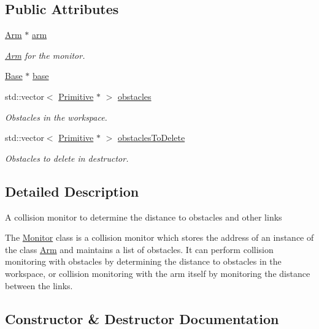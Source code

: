 \subsection*{Public Attributes}
\begin{DoxyCompactItemize}
\item 
\hyperlink{class_arm}{Arm} $\ast$ \hyperlink{class_monitor_a8b75571f6224f999a3dc05cf9a83fa68}{arm}
\begin{DoxyCompactList}\small\item\em \hyperlink{class_arm}{Arm} for the monitor. \end{DoxyCompactList}\item 
\hyperlink{class_base}{Base} $\ast$ \hyperlink{class_monitor_a62aac32130c77d66f9cec4a06d5e75a7}{base}
\item 
std\+::vector$<$ \hyperlink{class_primitive}{Primitive} $\ast$ $>$ \hyperlink{class_monitor_a05fd42482269ad65432d5400c8f0f9b5}{obstacles}
\begin{DoxyCompactList}\small\item\em Obstacles in the workspace. \end{DoxyCompactList}\item 
std\+::vector$<$ \hyperlink{class_primitive}{Primitive} $\ast$ $>$ \hyperlink{class_monitor_a2207169c2b32b3bbf9925f3254064dee}{obstacles\+To\+Delete}
\begin{DoxyCompactList}\small\item\em Obstacles to delete in destructor. \end{DoxyCompactList}\end{DoxyCompactItemize}


\subsection{Detailed Description}
A collision monitor to determine the distance to obstacles and other links

The \hyperlink{class_monitor}{Monitor} class is a collision monitor which stores the address of an instance of the class \hyperlink{class_arm}{Arm} and maintains a list of obstacles. It can perform collision monitoring with obstacles by determining the distance to obstacles in the workspace, or collision monitoring with the arm itself by monitoring the distance between the links. 

\subsection{Constructor \& Destructor Documentation}
